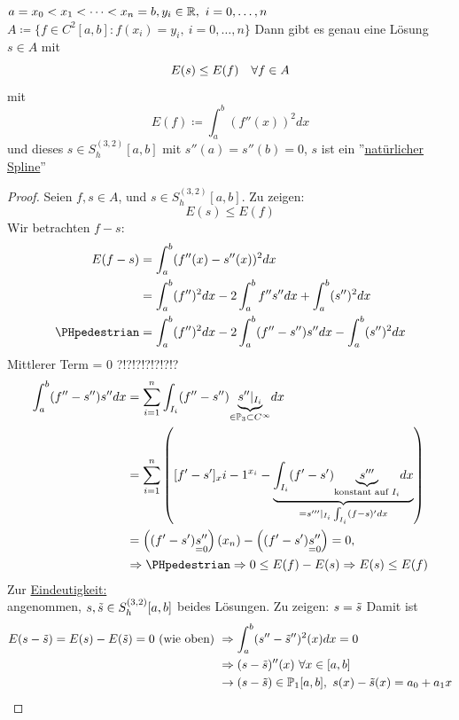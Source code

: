 \documentclass[../Skript.tex]{subfiles}
\begin{document}
\begin{theorem}
    \(a=x_0<x_1<\dots<x_n=b, y_i \in \mathbb{R} , \ i=0,\dots,n\)\\
    \(A\coloneqq \{ f\in C^2[a,b]\colon f(x_i)=y_i, \ i=0,\dots,n\}\)
    Dann gibt es genau eine Lösung $s\in A$ mit \[
        E(s) \leq E(f)\hspace{1em} \forall f\in A
    \] mit \[
        E(f) \coloneqq \int_a^b (f''(x))^2 dx
    \]
    und dieses \(s\in S^{(3,2)}_h[a,b]\) mit $s''(a)=s''(b)=0$, $s$ ist ein ''\underline{natürlicher Spline}''
    
\end{theorem}
\begin{proof}
    Seien $f,s\in A$, und $s\in S^{(3,2)}_h[a,b]$. Zu zeigen:\[
        E(s) \leq E(f)
    \]
    Wir betrachten $f-s$: \begin{align*}
        E(f-s) &= \int_a^b (f''(x) - s''(x))^2 dx\\
               &= \int_a^b (f'')^2 dx  - 2 \int_a^b f''s'' dx + \int_a^b (s'')^2 dx\\
              \text{\PHpedestrian} &= \int_a^b (f'')^2 dx - 2 \int_a^b(f'' - s'')s'' dx - \int_a^b (s'')^2 dx
    \end{align*}
    Mittlerer Term = 0 ?!?!?!?!?!?!?\begin{align*}
        \int_a^b(f'' - s'') s'' dx &= \dsum_{i=1}^n \int_{I_i}(f'' - s'')\underset{\in \bbP_3 \subset C^\infty}
        {\underbrace{s''\vert_{I_i}}} dx\\
        &= \dsum_{i=1}^n\left([f'-s']_x{i-1}^{x_i} - \underset{=s'''\vert_{I_i} \int_{I_i}(f-s)'dx}{\underbrace{\int_{I_i}
        (f'-s')\underset{\text{konstant auf $I_i$}}
        {\underbrace{s'''}} dx}}\right)\\
        &=\left((f'-s')\underset{=0}{s''}\right)(x_n)-\left((f'-s')\underset{=0}{s''}\right)=0, \\ &\Rightarrow 
        \text{\PHpedestrian} \Rightarrow 0\leq E(f)-E(s) \Rightarrow E(s)\leq E(f)
    \end{align*}
    Zur \underline{Eindeutigkeit:}\\
   \newcommand{\Ts}{\Tilde{s}}
    angenommen, $s,\Tilde{s} \in S^{(3,2)}_h[a,b]$ beides Lösungen. Zu zeigen: 
        $s=\Tilde{s}$
    Damit ist 
    \begin{align*}
        E(s-\Tilde{s})= E(s)-E(\Tilde{s})=0\text{ (wie oben) } &\Rightarrow \int_a^b(s''-\Ts'')^2(x)dx = 0 \\
        &\Rightarrow (s-\Ts)''(x)\ \forall x\in [a,b]\\
        &\rightarrow (s-\Ts)\in\bbP_1[a,b], \ s(x)-\Ts(x)=a_0+a_1x\\

\end{align*}
\end{proof}
\end{document}
